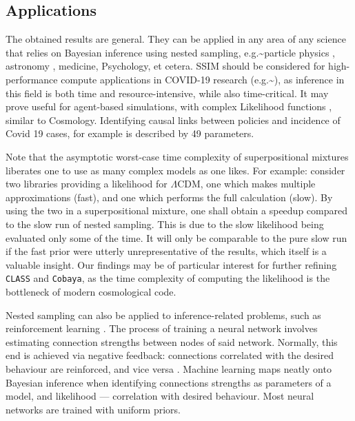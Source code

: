 \documentclass[draft,usenatbib]{mnras}
\begin{document}
\subsection{Applications}
\label{sec:org488def7}

The obtained results are general. They can be applied in any area of
any science that relies on Bayesian inference using nested sampling,
e.g.\textasciitilde{}particle physics \citep{multinest}, astronomy
\citep{Casado_2016}, medicine, Psychology, et cetera. SSIM should be
considered for high-performance compute applications in COVID-19
research (e.g.\textasciitilde{}\cite{Covid1,Covid2}), as inference in this field is
both time and resource-intensive, while also time-critical. It may
prove useful for agent-based simulations, with complex Likelihood
functions \citep{Covid2}, similar to Cosmology. Identifying causal
links between policies and incidence of Covid 19 cases, for example is
described by 49 parameters.

Note that the asymptotic worst-case time complexity of superpositional
mixtures liberates one to use as many complex models as one likes. For
example: consider two libraries providing a likelihood for
\(\Lambda\)CDM, one which makes multiple approximations (fast), and
one which performs the full calculation (slow). By using the two in a
superpositional mixture, one shall obtain a speedup compared to the
slow run of nested sampling. This is due to the slow likelihood being
evaluated only some of the time. It will only be comparable to the
pure slow run if the fast prior were utterly unrepresentative of the
results, which itself is a valuable insight. Our findings may be of
particular interest for further refining \texttt{CLASS} and
\texttt{Cobaya}, as the time complexity of computing the likelihood is
the bottleneck of modern cosmological code.

Nested sampling can also be applied to inference-related problems,
such as reinforcement learning \citep{javid2020}. The process of
training a neural network involves estimating connection strengths
between nodes of said network. Normally, this end is achieved via
negative feedback: connections correlated with the desired behaviour
are reinforced, and vice versa \citep{Kaelbling_1996}. Machine
learning maps neatly onto Bayesian inference when identifying
connections strengths as parameters of a model, and likelihood ---
correlation with desired behaviour. Most neural networks are trained
with uniform priors.
\end{document}
